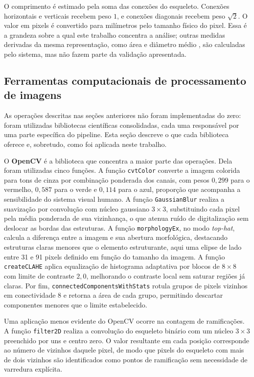 \documentclass[12pt]{article}
\begin{document}
O comprimento é estimado pela soma das conexões do esqueleto. Conexões horizontais e verticais recebem peso $1$, e conexões diagonais recebem peso $\sqrt{2}$. O valor em pixels é convertido para milímetros pelo tamanho físico do pixel. Essa é a grandeza sobre a qual este trabalho concentra a análise; outras medidas derivadas da mesma representação, como área e diâmetro médio \cite{felzenszwalb2012distance}, são calculadas pelo sistema, mas não fazem parte da validação apresentada.

\subsection{Ferramentas computacionais de processamento de imagens}
\label{sec:ferramentas-pdi}

As operações descritas nas seções anteriores não foram implementadas do zero: foram utilizadas bibliotecas científicas consolidadas, cada uma responsável por uma parte específica do pipeline. Esta seção descreve o que cada biblioteca oferece e, sobretudo, como foi aplicada neste trabalho.

O \textbf{OpenCV} \cite{bradski2000opencv} é a biblioteca que concentra a maior parte das operações. Dela foram utilizadas cinco funções. A função \texttt{cvtColor} converte a imagem colorida para tons de cinza por combinação ponderada dos canais, com pesos $0{,}299$ para o vermelho, $0{,}587$ para o verde e $0{,}114$ para o azul, proporção que acompanha a sensibilidade do sistema visual humano. A função \texttt{GaussianBlur} realiza a suavização por convolução com núcleo gaussiano $3 \times 3$, substituindo cada pixel pela média ponderada de sua vizinhança, o que atenua ruído de digitalização sem deslocar as bordas das estruturas. A função \texttt{morphologyEx}, no modo \textit{top-hat}, calcula a diferença entre a imagem e sua abertura morfológica, destacando estruturas claras menores que o elemento estruturante, aqui uma elipse de lado entre 31 e 91 pixels definido em função do tamanho da imagem. A função \texttt{createCLAHE} aplica equalização de histograma adaptativa por blocos de $8 \times 8$ com limite de contraste $2{,}0$, melhorando o contraste local sem saturar regiões já claras. Por fim, \texttt{connectedComponentsWithStats} rotula grupos de pixels vizinhos em conectividade 8 e retorna a área de cada grupo, permitindo descartar componentes menores que o limite estabelecido.

Uma aplicação menos evidente do OpenCV ocorre na contagem de ramificações. A função \texttt{filter2D} realiza a convolução do esqueleto binário com um núcleo $3 \times 3$ preenchido por uns e centro zero. O valor resultante em cada posição corresponde ao número de vizinhos daquele pixel, de modo que pixels do esqueleto com mais de dois vizinhos são identificados como pontos de ramificação sem necessidade de varredura explícita.
\end{document}

